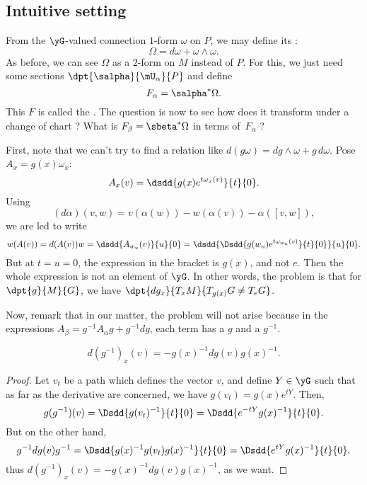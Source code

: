 \subsection{Intuitive setting}

From the $\yG$-valued connection $1$-form $\omega$ on $P$, we may define its  :
\begin{equation}
     \Omega=d\omega+\omega\wedge\omega.
\end{equation}
As before, we can see $\Omega$ as a $2$-form on $M$ instead of $P$. For this, we just need some sections $\dpt{\salpha}{\mU_{\alpha}}{P}$ and define
\begin{equation}
        F_{\alpha}=\salpha^*\Omega.
\end{equation}
This $F$ is called the . The question is now to see how does it transform under a change of chart ? What is $F_{\beta}=\sbeta^*\Omega$ in terms of~$F_{\alpha}$ ?

First, note that we can't try to find a relation like $d(g\omega)=dg\wedge\omega+g\,d\omega$. Pose $A_x=g(x)\omega_x$:
\[
  A_x(v)=\dsdd{g(x)e^{t\omega_x(v)}}{t}{0}.
\]
Using
\[
   (d\alpha)(v,w)=v(\alpha(w))-w(\alpha(v))-\alpha([v,w]),
\]
we are led to write
\begin{equation}
     w(A(v))=d(A(v))w
            =\dsdd{A_{w_u}(v)}{u}{0}
	    =\dsdd{ \Dsdd{g(w_u)e^{t\omega_{w_u}(v)}}{t}{0} }{u}{0}.
\end{equation}
But at $t=u=0$, the expression in the bracket is $g(x)$, and not $e$. Then the whole expression is not an element of $\yG$. In other words, the problem is that for $\dpt{g}{M}{G}$, we have $\dpt{dg_x}{T_xM}{T_{g(x)}G\neq T_eG}$.

Now, remark that in our matter, the problem will not arise because in the expressions $A_{\beta}=g^{-1} A_{\alpha} g+g^{-1} dg$, each term has a $g$ and a $g^{-1}$.

\begin{lemma}
\begin{equation}
   d(g^{-1})_x(v)=-g(x)^{-1} dg(v)g(x)^{-1}.
\end{equation}
\label{lem:dgemu}
\end{lemma}

\begin{proof}
Let $v_t$ be a path which defines the vector $v$, and define $Y\in\yG$ such that as far as the derivative are concerned, we have $g(v_t)=g(x)e^{tY}$. Then,
\[
      g(g^{-1})(v)=\Dsdd{g(v_t)^{-1}}{t}{0}=\Dsdd{e^{-tY}g(x)^{-1}}{t}{0}.
\]
But on the other hand,
\[
  g^{-1} dg(v)g^{-1}=\Dsdd{g(x)^{-1} g(v_t)g(x)^{-1}}{t}{0}=\Dsdd{e^{tY}g(x)^{-1}}{t}{0},
\]
thus $d(g^{-1})_x(v)=-g(x)^{-1} dg(v)g(x)^{-1}$, as we want.
\end{proof}

